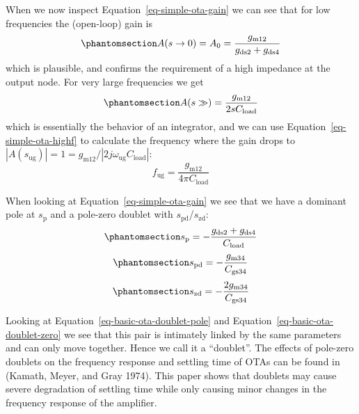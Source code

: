 \documentclass[
  a4paper,
  DIV=11,
  numbers=noendperiod]{scrartcl}
\begin{document}
When we now inspect Equation~\ref{eq-simple-ota-gain} we can see that
for low frequencies the (open-loop) gain is
\begin{equation}\phantomsection\label{eq-simple-ota-gain-dc}{
A(s \rightarrow 0) = A_0 = \frac{g_\mathrm{m12}}{g_\mathrm{ds2} + g_\mathrm{ds4}}
}\end{equation} which is plausible, and confirms the requirement of a
high impedance at the output node. For very large frequencies we get
\begin{equation}\phantomsection\label{eq-simple-ota-highf}{
A (s \gg) = \frac{g_\mathrm{m12}}{2 s C_\mathrm{load}}
}\end{equation} which is essentially the behavior of an integrator, and
we can use Equation~\ref{eq-simple-ota-highf} to calculate the frequency
where the gain drops to
\(|A(s_\mathrm{ug})| = 1 = g_\mathrm{m12}/|2 j \omega_\mathrm{ug} C_\mathrm{load}|\):
\[
f_\mathrm{ug} = \frac{g_\mathrm{m12}}{4 \pi C_\mathrm{load}}
\]

When looking at Equation~\ref{eq-simple-ota-gain} we see that we have a
dominant pole at \(s_\mathrm{p}\) and a pole-zero doublet with
\(s_\mathrm{pd}\)/\(s_\mathrm{zd}\):
\begin{equation}\phantomsection\label{eq-basic-ota-dominant-pole}{
s_\mathrm{p} = -\frac{g_\mathrm{ds2} + g_\mathrm{ds4}}{C_\mathrm{load}}
}\end{equation}
\begin{equation}\phantomsection\label{eq-basic-ota-doublet-pole}{
s_\mathrm{pd} = -\frac{g_\mathrm{m34}}{C_\mathrm{gs34}}
}\end{equation}
\begin{equation}\phantomsection\label{eq-basic-ota-doublet-zero}{
s_\mathrm{zd} = -\frac{2 g_\mathrm{m34}}{C_\mathrm{gs34}}
}\end{equation}

\begin{tcolorbox}[enhanced jigsaw, colframe=quarto-callout-note-color-frame, opacityback=0, title=\textcolor{quarto-callout-note-color}{\faInfo}\hspace{0.5em}{Why a Pole-Zero Doublet?}, bottomtitle=1mm, breakable, toprule=.15mm, colbacktitle=quarto-callout-note-color!10!white, rightrule=.15mm, arc=.35mm, toptitle=1mm, coltitle=black, bottomrule=.15mm, leftrule=.75mm, titlerule=0mm, colback=white, opacitybacktitle=0.6, left=2mm]

Looking at Equation~\ref{eq-basic-ota-doublet-pole} and
Equation~\ref{eq-basic-ota-doublet-zero} we see that this pair is
intimately linked by the same parameters and can only move together.
Hence we call it a ``doublet''. The effects of pole-zero doublets on the
frequency response and settling time of OTAs can be found in (Kamath,
Meyer, and Gray 1974). This paper shows that doublets may cause severe
degradation of settling time while only causing minor changes in the
frequency response of the amplifier.

\end{tcolorbox}
\end{document}
